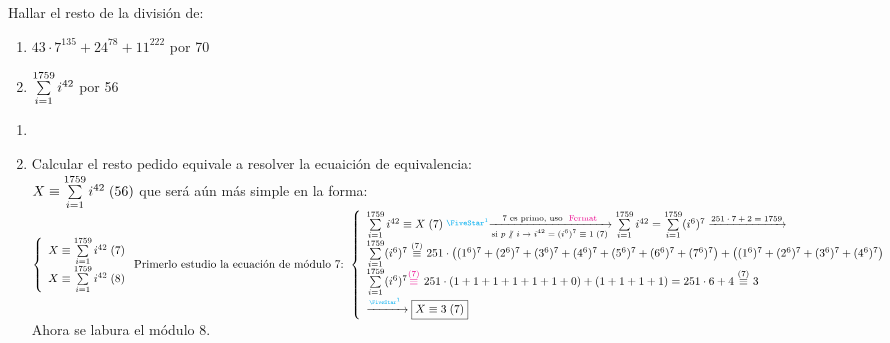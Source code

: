 \documentclass[12pt,a4paper, spanish]{article}
\begin{document}
\setcounter{ejercicio}{19}
\ejercicio

\def\sumLocal{\sumatoria{i=1}{1759}}

Hallar el resto de la división de:
\begin{enumerate}[label=\roman*)]
	\item $43 \cdot 7^{135} + 24^{78} + 11^{222}$ por 70
	\item $\sumLocal i^{42}$ por 56
\end{enumerate}

\separadorCorto

\begin{enumerate}[label=\roman*)]
	\item \hacer

	\item Calcular el resto pedido equivale a resolver la ecuaición de equivalencia:\\
	      $ \congruencia{X}{\sumLocal i^{42}}{56} $ que será aún más simple en la forma:
	      $\llave{l}{
			      \congruencia{X}{\sumLocal i^{42}}{7}\\
			      \congruencia{X}{\sumLocal i^{42}}{8}
		      }\\
		      \text{Primerlo estudio la ecuación de módulo 7: }\\
		      \llave{l}{
			      \congruencia{\sumLocal i^{42}}{X}{7} \llamada1

			      \flecha{7 es primo, uso \magenta{Fermat}}[si $p \noDivide i \to i^{42} = \congruencia{(i^6)^7}{1}{7}$]
			      \sumLocal i^{42} = \sumLocal (i^6)^7
			      \flecha{$251 \cdot 7 + 2 = 1759$}\\
			      \sumLocal (i^6)^7 \conga7 251 \cdot \parentesis{(1^6)^7 + (2^6)^7 + (3^6)^7 + (4^6)^7 + (5^6)^7 + (6^6)^7 + (7^6)^7} + \parentesis{(1^6)^7 + (2^6)^7 + (3^6)^7 + (4^6)^7}\\
			      \sumLocal (i^6)^7 \magenta{$\conga7$ } 251 \cdot \parentesis{1 + 1 + 1 + 1 + 1 + 1 + 0} + \parentesis{1 + 1 + 1 + 1} =
			      251 \cdot  6 + 4 \conga7 3\\
			      \flecha{$\llamada1$ } \boxed{\congruencia{X}{3}{7}}\\
		      }$\\
	      Ahora se labura el módulo 8.\\


\end{enumerate}
\end{document}
